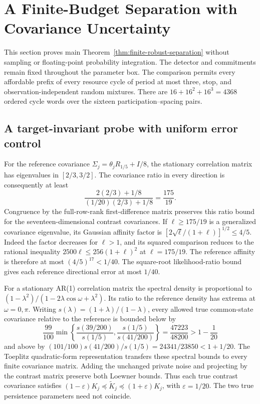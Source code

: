 \section{A Finite-Budget Separation with Covariance Uncertainty}
\label{sec:finite-robust}
This section proves main Theorem~\ref{thm:finite-robust-separation} without sampling or floating-point probability integration.
The detector and commitments remain fixed throughout the parameter box.
The comparison permits every affordable prefix of every resource cycle of period at most three, stop, and observation-independent random mixtures.
There are $16+16^2+16^3=4368$ ordered cycle words over the sixteen participation--spacing pairs.

\subsection{A target-invariant probe with uniform error control}
For the reference covariance $\Sigma_j=\theta_jR_{1/5}+I/8$, the stationary correlation matrix has eigenvalues in $[2/3,3/2]$.
The covariance ratio in every direction is consequently at least
\[
\frac{2(2/3)+1/8}{(1/20)(2/3)+1/8}=\frac{175}{19}.
\]
Congruence by the full-row-rank first-difference matrix preserves this ratio bound for the seventeen-dimensional contrast covariances.
If $\ell\ge175/19$ is a generalized covariance eigenvalue, its Gaussian affinity factor is $[2\sqrt\ell/(1+\ell)]^{1/2}\le4/5$.
Indeed the factor decreases for $\ell>1$, and its squared comparison reduces to the rational inequality $2500\ell\le256(1+\ell)^2$ at $\ell=175/19$.
The reference affinity is therefore at most $(4/5)^{17}<1/40$.
The square-root likelihood-ratio bound gives each reference directional error at most $1/40$.

For a stationary AR(1) correlation matrix the spectral density is proportional to $(1-\lambda^2)/(1-2\lambda\cos\omega+\lambda^2)$.
Its ratio to the reference density has extrema at $\omega=0,\pi$.
Writing $s(\lambda)=(1+\lambda)/(1-\lambda)$, every allowed true common-state covariance relative to the reference is bounded below by
\[
\frac{99}{100}\min\left\{\frac{s(39/200)}{s(1/5)},\frac{s(1/5)}{s(41/200)}\right\}
=\frac{47223}{48200}>1-\frac1{20}
\]
and above by $(101/100)s(41/200)/s(1/5)=24341/23850<1+1/20$.
The Toeplitz quadratic-form representation transfers these spectral bounds to every finite covariance matrix.
Adding the unchanged private noise and projecting by the contrast matrix preserve both Loewner bounds.
Thus each true contrast covariance satisfies $(1-\varepsilon)K_j\preceq\widetilde K_j\preceq(1+\varepsilon)K_j$, with $\varepsilon=1/20$.
The two true persistence parameters need not coincide.

